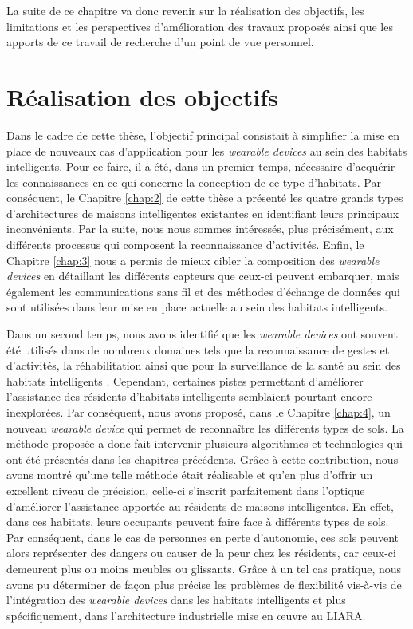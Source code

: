 La suite de ce chapitre va donc revenir sur la réalisation des objectifs, les limitations et les perspectives d’amélioration des travaux proposés ainsi que les apports de ce travail de recherche d’un point de vue personnel.

\section{Réalisation des objectifs}

Dans le cadre de cette thèse, l'objectif principal consistait à simplifier la mise en place de nouveaux cas d'application pour les \textit{wearable devices} au sein des habitats intelligents. Pour ce faire, il a été, dans un premier temps, nécessaire d'acquérir les connaissances en ce qui concerne la conception de ce type d'habitats. Par conséquent, le Chapitre \ref{chap:2} de cette thèse a présenté les quatre grands types d'architectures de maisons intelligentes existantes en identifiant leurs principaux inconvénients. Par la suite, nous nous sommes intéressés, plus précisément, aux différents processus qui composent la reconnaissance d'activités. Enfin, le Chapitre \ref{chap:3} nous a permis de mieux cibler la composition des \textit{wearable devices} en détaillant les différents capteurs que ceux-ci peuvent embarquer, mais également les communications sans fil et des méthodes d'échange de données qui sont utilisées dans leur mise en place actuelle au sein des habitats intelligents.

Dans un second temps, nous avons identifié que les \textit{wearable devices} ont souvent été utilisés dans de nombreux domaines tels que la reconnaissance de gestes et d’activités, la réhabilitation ainsi que pour la surveillance de la santé au sein des habitats intelligents \citep{Khan2016,Davis2016,Chapron2018}. Cependant, certaines pistes permettant d’améliorer l’assistance des résidents d’habitats intelligents semblaient pourtant encore inexplorées. Par conséquent, nous avons proposé, dans le Chapitre \ref{chap:4}, un nouveau \textit{wearable device} qui permet de reconnaître les différents types de sols. La méthode proposée a donc fait intervenir plusieurs algorithmes et technologies qui ont été présentés dans les chapitres précédents. Grâce à cette contribution, nous avons montré qu'une telle méthode était réalisable et qu'en plus d'offrir un excellent niveau de précision, celle-ci s'inscrit parfaitement dans l'optique d'améliorer l'assistance apportée au résidents de maisons intelligentes. En effet, dans ces habitats, leurs occupants peuvent faire face à différents types de sols. Par conséquent, dans le cas de personnes en perte d'autonomie, ces sols peuvent alors représenter des dangers ou causer de la peur chez les résidents, car ceux-ci demeurent plus ou moins meubles ou glissants. Grâce à un tel cas pratique, nous avons pu déterminer de façon plus précise les problèmes de flexibilité vis-à-vis de l'intégration des \textit{wearable devices} dans les habitats intelligents et plus spécifiquement, dans l'architecture industrielle mise en \oe{}uvre au \ac{LIARA}.

